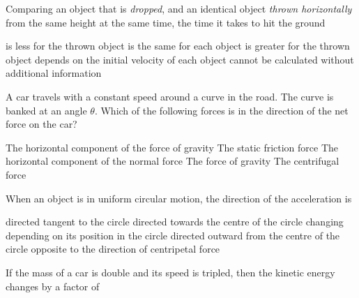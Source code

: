 \documentclass[addpoints,12pt]{exam}
\begin{document}
\begin{questions}
  \question[2] Comparing an object that is \emph{dropped}, and an identical
  object \emph{thrown horizontally} from the same height at the same time, the
  time it takes to hit the ground \underline{\hspace{1in}}
  \begin{choices}
    \choice is less for the thrown object
    \choice is the same for each object
    \choice is greater for the thrown object
    \choice depends on the initial velocity of each object
    \choice cannot be calculated without additional information
  \end{choices}
  \vspace{-.2in}\answerline
  
  \question[2] A car travels with a constant speed around a curve in the road.
  The curve is banked at an angle $\theta$. Which of the following forces is in
  the direction of the net force on the car?
  \begin{choices}
    \choice The horizontal component of the force of gravity
    \choice The static friction force
    \choice The horizontal component of the normal force
    \choice The force of gravity
    \choice The centrifugal force
  \end{choices}
  \vspace{-.2in}\answerline
    
  \question[2] When an object is in uniform circular motion, the direction of
  the acceleration is \underline{\hspace{.5in}}
  \begin{choices}
    \choice directed tangent to the circle
    \choice directed towards the centre of the circle
    \choice changing depending on its position in the circle
    \choice directed outward from the centre of the circle
    \choice opposite to the direction of centripetal force
  \end{choices}
  \vspace{-.25in}\answerline
  \newpage
  
  \question[2] If the mass of a car is double and its speed is tripled, then
  the kinetic energy changes by a factor of \underline{\hspace{.6in}}
  \begin{choices}
  \end{choices}
  \vspace{-.2in}\answerline
    

\end{questions}
\end{document}
